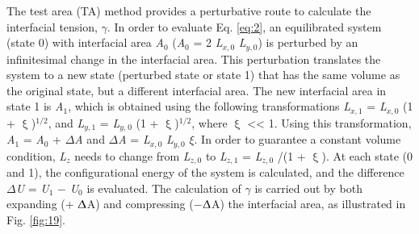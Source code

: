 \documentclass[9pt,bestpractices]{livecoms}
\begin{document}
The test area (TA) method provides a perturbative route to calculate the
interfacial tension, {${\gamma}$}. In order to evaluate Eq. \ref{eq:2}, an
equilibrated system (state 0) with interfacial area \textit{A}$_{0}$
(\textit{A}$_{0}$ = 2 \textit{L}$_{x,0}$ \textit{L}$_{y,0}$) is perturbed by an
infinitesimal change in the interfacial area. This perturbation translates the
system to a new state (perturbed state or state 1) that has the same volume as
the original state, but a different interfacial area. The new interfacial area
in state 1 is \textit{A}$_{1}$, which is obtained using the following
transformations \textit{L}$_{x,1}$ = \textit{L}$_{x,0}$ (1
+ {${\upxi}$})$^{\mathrm{1/2}}$, and \textit{L}$_{y,1}$
= \textit{L}$_{y,}$$_{0}$ (1 + {${\upxi}$})$^{\mathrm{ 1/2}}$, where
{${\upxi}$} {\textless}{\textless} 1. Using this transformation,
\textit{A}$_{1}$ = \textit{A}$_{0}$ + {${\Delta}$}\textit{A} and
{${\Delta}$}\textit{A} = \textit{L}$_{x,0}$ \textit{L}$_{y,0}$ {${\xi}$}. In
order to guarantee a constant volume condition, \textit{L}$_{z}$ needs to
change from \textit{L}$_{z,0}$ to \textit{L}$_{z,1}$ = \textit{L}$_{z,0}$ /(1
+ {${\upxi}$}). At each state (0 and 1), the configurational energy of the
system is calculated, and the difference {${\Delta}$}\textit{U}
= \textit{U}$_{1}$ ${-}$ \textit{U}$_{0}$ is evaluated. The calculation of
{${\gamma}$} is carried out by both expanding (+ {${\Updelta}$}A) and
compressing (${-}${${\Updelta}$}A) the interfacial area, as illustrated
in Fig. \ref{fig:19}.
\end{document}
